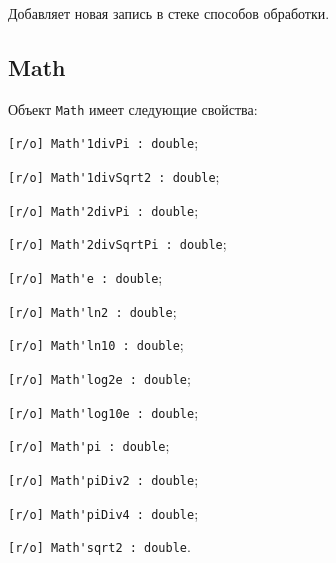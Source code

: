 Добавляет новая запись в стеке способов обработки.

\subsection{{\color{orange} Math}}

Объект \lstinline|Math| имеет следующие свойства:
\begin{icItems}
	\item \lstinline|[r/o] Math'1divPi : double|;
	\item \lstinline|[r/o] Math'1divSqrt2 : double|;
	\item \lstinline|[r/o] Math'2divPi : double|;
	\item \lstinline|[r/o] Math'2divSqrtPi : double|;
	\item \lstinline|[r/o] Math'e : double|;
	\item \lstinline|[r/o] Math'ln2 : double|;
	\item \lstinline|[r/o] Math'ln10 : double|;
	\item \lstinline|[r/o] Math'log2e : double|;
	\item \lstinline|[r/o] Math'log10e : double|;
	\item \lstinline|[r/o] Math'pi : double|;
	\item \lstinline|[r/o] Math'piDiv2 : double|;
	\item \lstinline|[r/o] Math'piDiv4 : double|;
	\item \lstinline|[r/o] Math'sqrt2 : double|.
\end{icItems}

